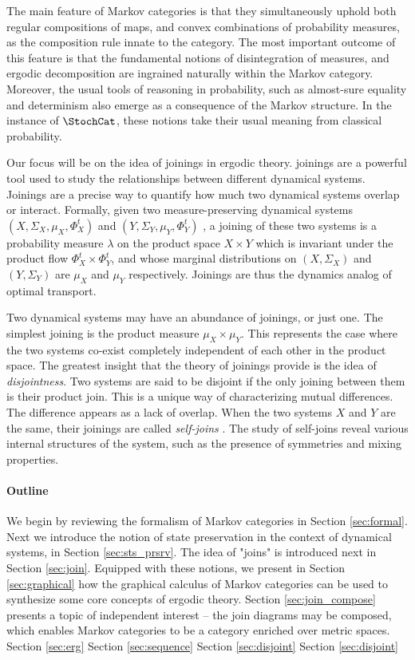 \documentclass[12pt,oneside,pb-diagram]{article}
\begin{document}
The main feature of Markov categories is that they simultaneously uphold both regular compositions of maps, and convex combinations of probability measures, as the composition rule innate to the category. The most important outcome of this feature is that the fundamental notions of disintegration of measures, and ergodic decomposition are ingrained naturally within the Markov category. Moreover, the usual tools of reasoning in probability, such as almost-sure equality and determinism also emerge as a consequence of the Markov structure. In the instance of $\StochCat$, these notions take their usual meaning from classical probability.

Our focus will be on the idea of joinings \cite[e.g.]{glasner2000entropy, weiss1985strictly, LemanczykEtAl1993gaussian, Rue2006join}  in ergodic theory. joinings are a powerful tool used to study the relationships between different dynamical systems. Joinings are a precise way to quantify how much two dynamical systems overlap or interact. Formally, given two measure-preserving dynamical systems $(X, \Sigma_X, \mu_X, \Phi_X^t)$ and $(Y, \Sigma_Y, \mu_Y, \Phi_Y^t)$ , a joining of these two systems is a probability measure $\lambda$ on the product space $X \times Y$ which is invariant under the product flow $\Phi_X^t \times \Phi_Y^t$, and whose marginal distributions on $(X, \Sigma_X)$ and $(Y, \Sigma_Y)$ are $\mu_X$ and $\mu_Y$ respectively. Joinings are thus the dynamics analog of optimal transport. 

Two dynamical systems may have an abundance of joinings, or just one. The simplest joining is the product measure $\mu_X \times \mu_Y$. This represents the case where the two systems co-exist completely independent of each other in the product space. The greatest insight that the theory of joinings provide is the idea of \emph{disjointness}. Two systems are said to be disjoint if the only joining between them is their product join. This is a unique way of characterizing mutual differences. The difference appears as a lack of overlap. When the two systems $X$ and $Y$ are the same, their joinings are called \emph{self-joins} . The study of self-joins reveal various internal structures of the system, such as the presence of symmetries and mixing properties. 

\paragraph{Outline} We begin by reviewing the formalism of Markov categories in Section \ref{sec:formal}. Next we introduce the notion of state preservation in the context of dynamical systems, in Section \ref{sec:sts_prsrv}. The idea of "joins" is introduced next in Section \ref{sec:join}. Equipped with these notions, we present in Section \ref{sec:graphical} how the graphical calculus of Markov categories can be used to synthesize some core concepts of ergodic theory. Section \ref{sec:join_compose} presents a topic of independent interest -- the join diagrams may be composed, which enables Markov categories to be a category enriched over metric spaces. Section \ref{sec:erg} Section \ref{sec:sequence} Section \ref{sec:disjoint} Section \ref{sec:disjoint}
\end{document}
